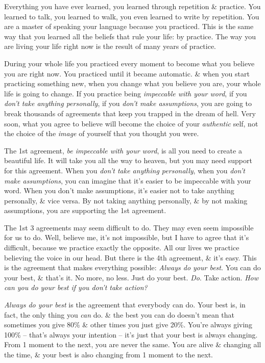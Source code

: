 \documentclass{article}
\numberwithin{equation}{section}
\begin{document}
Everything you have ever learned, you learned through repetition \& practice. You learned to talk, you learned to walk, you even learned to write by repetition. You are a master of speaking your language because you practiced. This is the same way that you learned all the beliefs that rule your life: by practice. The way you are living your life right now is the result of many years of practice.

During your whole life you practiced every moment to become what you believe you are right now. You practiced until it became automatic. \& when you start practicing something new, when you change what you believe you are, your whole life is going to change. If you practice being \textit{impeccable with your word}, if you \textit{don't take anything personally}, if you \textit{don't make assumptions}, you are going to break thousands of agreements that keep you trapped in the dream of hell. Very soon, what you agree to believe will become the choice of your \textit{authentic} self, not the choice of the \textit{image} of yourself that you thought you were.

The 1st agreement, \textit{be impeccable with your word}, is all you need to create a beautiful life. It will take you all the way to heaven, but you may need support for this agreement. When you \textit{don't take anything personally}, when you \textit{don't make assumptions}, you can imagine that it's easier to be impeccable with your word. When you don't make assumptions, it's easier not to take anything personally, \& vice versa. By not taking anything personally, \& by not making assumptions, you are supporting the 1st agreement.

The 1st 3 agreements may seem difficult to do. They may even seem impossible for us to do. Well, believe me, it's not impossible, but I have to agree that it's difficult, because we practice exactly the opposite. All our lives we practice believing the voice in our head. But there is the 4th agreement, \& it's easy. This is the agreement that makes everything possible: \textit{Always do your best}. You can do your best, \& that's it. No more, no less. Just do your best. \textit{Do}. Take action. \textit{How can you do your best if you don't take action?}

\textit{Always do your best} is the agreement that everybody can do. Your best is, in fact, the only thing you \textit{can} do. \& the best you can do doesn't mean that sometimes you give 80\% \& other times you just give 20\%. You're always giving 100\% -- that's always your intention -- it's just that your best is always changing. From 1 moment to the next, you are never the same. You are alive \& changing all the time, \& your best is also changing from 1 moment to the next.
\end{document}

